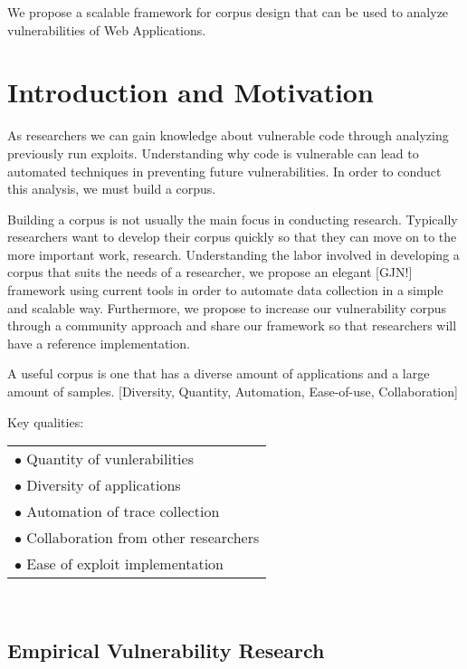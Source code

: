 \documentclass[letterpaper,twocolumn,10pt]{article}
\begin{document}
We propose a scalable framework for corpus design that can be used to analyze vulnerabilities of Web Applications.    \\

\section{Introduction and Motivation}

As researchers we can gain knowledge about vulnerable code through analyzing previously run exploits.  Understanding why code is vulnerable can lead to automated techniques in preventing future vulnerabilities.  In order to conduct this analysis, we must build a corpus.  

Building a corpus is not usually the main focus in conducting research.  Typically researchers want to develop their corpus quickly so that they can move on to the more important work, research.  Understanding the labor involved in developing a corpus that suits the needs of a researcher, we propose an elegant [GJN!] framework using current tools in order to automate data collection in a simple and scalable way.  Furthermore, we propose to increase our vulnerability corpus through a community approach and share our framework so that researchers will have a reference implementation.

A useful corpus is one that has a diverse amount of applications and a large amount of samples.
[Diversity, Quantity, Automation, Ease-of-use, Collaboration]

Key qualities:\\
 \begin{tabular}{ l }
   $\bullet$ Quantity of vunlerabilities\\
   $\bullet$ Diversity of applications\\
   $\bullet$ Automation of trace collection\\
   $\bullet$ Collaboration from other researchers\\
   $\bullet$ Ease of exploit implementation\\

 \end{tabular}
\\

\subsection{Empirical Vulnerability Research}
\end{document}

